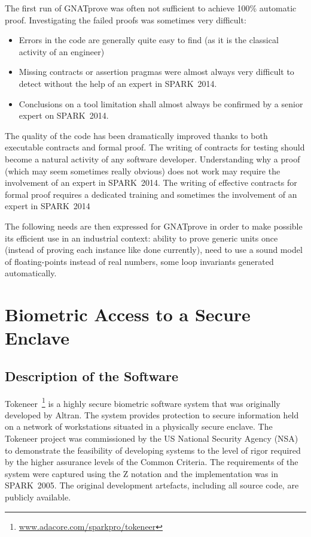 \documentclass[10pt,a4paper,twocolumn]{article}
\newcommand{\gnatprove}{GNATprove\xspace}
\newcommand{\oldspark}{SPARK~2005\xspace}
\newcommand{\newspark}{SPARK~2014\xspace}
\begin{document}
The first run of \gnatprove was often not sufficient to achieve 100\% automatic
proof. Investigating the failed proofs was sometimes very difficult:
\begin{itemize}
\item Errors in the code are generally quite easy to find (as it is
  the classical activity of an engineer)
\item Missing contracts or assertion pragmas were almost always very difficult to detect without
  the help of an expert in \newspark.
\item Conclusions on a tool limitation shall almost always be confirmed by
  a senior expert on \newspark.
\end{itemize}

The quality of the code has been dramatically improved thanks to both
executable contracts and formal proof.  The writing of contracts for testing
should become a natural activity of any software developer. Understanding why a
proof (which may seem sometimes really obvious) does not work may require the
involvement of an expert in \newspark. The writing of effective contracts for
formal proof requires a dedicated training and sometimes the involvement of an
expert in \newspark

The following needs are then expressed for \gnatprove in order to make possible
its efficient use in an industrial context: ability to prove generic units once
(instead of proving each instance like done currently), need to use a sound
model of floating-points instead of real numbers, some loop invariants
generated automatically.

\section{Biometric Access to a Secure Enclave}
\label{sec:tokeneer}

\subsection{Description of the Software}

Tokeneer~\footnote{\url{www.adacore.com/sparkpro/tokeneer}} is a highly secure
biometric software system that was originally developed by Altran. The system
provides protection to secure information held on a network of workstations
situated in a physically secure enclave. The Tokeneer project was commissioned
by the US National Security Agency (NSA) to demonstrate the feasibility of
developing systems to the level of rigor required by the higher assurance
levels of the Common Criteria. The requirements of the system were captured
using the Z notation and the implementation was in \oldspark. The original
development artefacts, including all source code, are publicly available.
\end{document}
